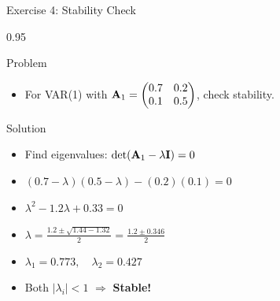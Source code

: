 \documentclass[9pt, aspectratio=169, t]{beamer}
\begin{document}
\begin{frame}{Exercise 4: Stability Check}
    \begin{cminipage}{0.95\textwidth}
    \begin{alertblock}{Problem}
        \begin{itemize}\setlength{\itemsep}{0pt}
            \item For VAR(1) with $\mathbf{A}_1 = \begin{pmatrix} 0.7 & 0.2 \\ 0.1 & 0.5 \end{pmatrix}$, check stability.
        \end{itemize}
    \end{alertblock}

    \vspace{0.2cm}
    \begin{exampleblock}{Solution}
        \begin{itemize}\setlength{\itemsep}{0pt}
            \item Find eigenvalues: $\det(\mathbf{A}_1 - \lambda \mathbf{I}) = 0$
            \item $(0.7 - \lambda)(0.5 - \lambda) - (0.2)(0.1) = 0$
            \item $\lambda^2 - 1.2\lambda + 0.33 = 0$
            \item $\lambda = \frac{1.2 \pm \sqrt{1.44 - 1.32}}{2} = \frac{1.2 \pm 0.346}{2}$
            \item $\lambda_1 = 0.773, \quad \lambda_2 = 0.427$
            \item Both $|\lambda_i| < 1$ $\Rightarrow$ \textbf{Stable!}
        \end{itemize}
    \end{exampleblock}
    \end{cminipage}
\end{frame}
\end{document}
